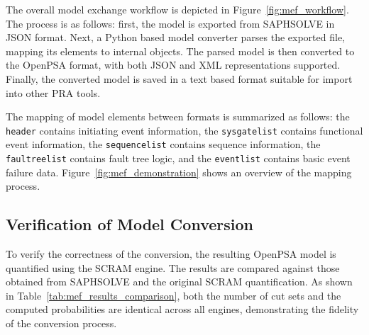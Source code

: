 



The overall model exchange workflow is depicted in Figure~\ref{fig:mef_workflow}. The process is as follows: first, the model is exported from SAPHSOLVE in JSON format. Next, a Python based model converter parses the exported file, mapping its elements to internal objects. The parsed model is then converted to the OpenPSA format, with both JSON and XML representations supported. Finally, the converted model is saved in a text based format suitable for import into other PRA tools.



The mapping of model elements between formats is summarized as follows: the \texttt{header} contains initiating event information, the \texttt{sysgatelist} contains functional event information, the \texttt{sequencelist} contains sequence information, the \texttt{faultreelist} contains fault tree logic, and the \texttt{eventlist} contains basic event failure data. Figure~\ref{fig:mef_demonstration} shows an overview of the mapping process.



\subsection{Verification of Model Conversion}

To verify the correctness of the conversion, the resulting OpenPSA model is quantified using the SCRAM engine. The results are compared against those obtained from SAPHSOLVE and the original SCRAM quantification. As shown in Table~\ref{tab:mef_results_comparison}, both the number of cut sets and the computed probabilities are identical across all engines, demonstrating the fidelity of the conversion process.

